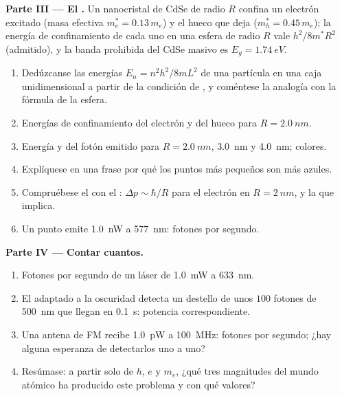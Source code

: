 \begin{problem}
\medskip
\noindent\textbf{Parte III --- El .}
Un nanocristal de CdSe de radio $R$ confina un electrón excitado
(masa efectiva $m_e^\ast = 0.13\,m_e$) y el hueco que deja
($m_h^\ast = 0.45\,m_e$); la energía de confinamiento de cada uno en una
esfera de radio $R$ vale $h^2/8m^\ast R^2$ (admitido), y la banda prohibida
del CdSe masivo es $E_g = \qty{1.74}{eV}$.
\begin{enumerate}[resume]
  \item Dedúzcanse las energías $E_n = n^2h^2/8mL^2$ de una partícula en
        una caja unidimensional a partir de la condición de , y coméntese la analogía con la fórmula de la esfera.
  \item Energías de confinamiento del electrón y del hueco para
        $R = \qty{2.0}{nm}$.
  \item Energía y  del fotón emitido para $R = \qty{2.0}{nm}$,
        \qty{3.0}{nm} y \qty{4.0}{nm}; colores.
  \item Explíquese en una frase por qué los puntos más pequeños son más azules.
  \item Compruébese el  con el : $\Delta p \sim \hbar/R$ para el electrón en $R = \qty{2}{nm}$, y la
         que implica.
  \item Un punto emite \qty{1.0}{nW} a \qty{577}{nm}: fotones por segundo.
\end{enumerate}

\medskip
\noindent\textbf{Parte IV --- Contar cuantos.}
\begin{enumerate}[resume]
  \item Fotones por segundo de un láser de \qty{1.0}{mW} a \qty{633}{nm}.
  \item El  adaptado a la oscuridad detecta un destello de unos $100$
        fotones de \qty{500}{nm} que llegan en \qty{0.1}{s}: potencia correspondiente.
  \item Una antena de FM recibe \qty{1.0}{pW} a \qty{100}{MHz}: fotones por
        segundo; ¿hay alguna esperanza de detectarlos uno a uno?
  \item Resúmase: a partir solo de $h$, $e$ y $m_e$, ¿qué tres magnitudes
        del mundo atómico ha producido este problema y con qué
        valores?
\end{enumerate}
\end{problem}
